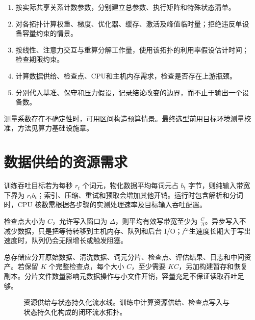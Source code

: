\documentclass[../textbook.tex]{subfiles}
\begin{document}
\begin{algorithm}[构建资源可行情景]
\label{alg:budget-scenarios}
\begin{enumerate}
\item 按实际共享关系计数参数，分别建立总参数、执行矩阵和特殊状态清单。
\item 对各拓扑计算权重、梯度、优化器、缓存、激活及峰值临时量；拒绝违反单设备容量约束的情景。
\item 按线性、注意力交互与重算分解工作量，使用该拓扑的利用率假设估计时间；检查期限约束。
\item 计算数据供给、检查点、CPU和主机内存需求，检查是否存在上游瓶颈。
\item 分别代入基准、保守和压力假设，记录结论改变的边界，而不止于输出一个设备数。
\end{enumerate}
测量系数存在不确定性时，可用区间构造预算情景。最终选型前用目标环境测量校准，方法见算力基础设施章。
\end{algorithm}

\section{数据供给的资源需求}

训练吞吐目标若为每秒 $r_t$ 个词元，物化数据平均每词元占 $b_t$ 字节，则纯输入带宽下界为 $r_tb_t$；索引、压缩、重试和预取会增加其他开销。运行时包含解析和分词时，CPU 核数需根据各步骤的实测处理速率及目标输入吞吐配置。

检查点大小为 $C$，允许写入窗口为 $\Delta$，则平均有效写带宽至少为 $\frac{C}{\Delta}$。异步写入不减少数据，只是把等待转移到主机内存、队列和后台 I/O；产生速度长期大于写出速度时，队列仍会无限增长或触发阻塞。

总存储应分开原始数据、清洗数据、词元分片、检查点、评估结果、日志和中间资产。若保留 $K$ 个完整检查点，每个大小 $C$，至少需要 $KC$，另加构建暂存和恢复副本。分片文件数量影响元数据操作与小文件开销，容量充足不保证读取吞吐足够。

\begin{figure}[htbp]
\centering
{}
\caption[资源供给与状态持久化流水线]{资源供给与状态持久化流水线。训练中计算资源供给、检查点写入与状态持久化构成的闭环流水拓扑。}\label{fig:resource-data-path}
\end{figure}
\end{document}
